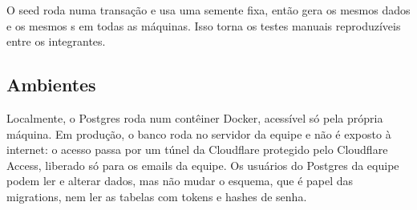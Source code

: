 O seed roda numa transação e usa uma semente fixa, então gera os mesmos dados
e os mesmos s em todas as máquinas. Isso torna os testes manuais
reproduzíveis entre os integrantes.

\subsection{Ambientes}

Localmente, o Postgres roda num contêiner Docker, acessível só pela própria
máquina. Em produção, o banco roda no servidor da equipe e não é exposto à
internet: o acesso passa por um túnel da Cloudflare protegido pelo Cloudflare
Access, liberado só para os emails da equipe. Os usuários do Postgres da
equipe podem ler e alterar dados, mas não mudar o esquema, que é papel das
migrations, nem ler as tabelas com tokens e hashes de senha.
